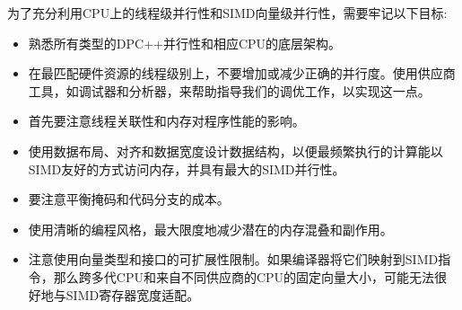 为了充分利用CPU上的线程级并行性和SIMD向量级并行性，需要牢记以下目标:\par

\begin{itemize}
	\item 熟悉所有类型的DPC++并行性和相应CPU的底层架构。
	\item 在最匹配硬件资源的线程级别上，不要增加或减少正确的并行度。使用供应商工具，如调试器和分析器，来帮助指导我们的调优工作，以实现这一点。
	\item 首先要注意线程关联性和内存对程序性能的影响。
	\item 使用数据布局、对齐和数据宽度设计数据结构，以便最频繁执行的计算能以SIMD友好的方式访问内存，并具有最大的SIMD并行性。
	\item 要注意平衡掩码和代码分支的成本。
	\item 使用清晰的编程风格，最大限度地减少潜在的内存混叠和副作用。
	\item 注意使用向量类型和接口的可扩展性限制。如果编译器将它们映射到SIMD指令，那么跨多代CPU和来自不同供应商的CPU的固定向量大小，可能无法很好地与SIMD寄存器宽度适配。
\end{itemize}

\newpage